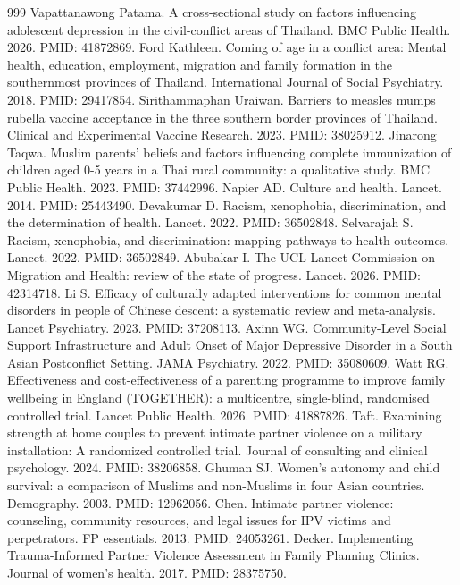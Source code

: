 \documentclass[11pt]{article}
\begin{document}
\begin{thebibliography}{999}
 Vapattanawong Patama. A cross-sectional study on factors influencing adolescent depression in the civil-conflict areas of Thailand. BMC Public Health. 2026. PMID: 41872869.
 Ford Kathleen. Coming of age in a conflict area: Mental health, education, employment, migration and family formation in the southernmost provinces of Thailand. International Journal of Social Psychiatry. 2018. PMID: 29417854.
 Sirithammaphan Uraiwan. Barriers to measles mumps rubella vaccine acceptance in the three southern border provinces of Thailand. Clinical and Experimental Vaccine Research. 2023. PMID: 38025912.
 Jinarong Taqwa. Muslim parents' beliefs and factors influencing complete immunization of children aged 0-5 years in a Thai rural community: a qualitative study. BMC Public Health. 2023. PMID: 37442996.
 Napier AD. Culture and health. Lancet. 2014. PMID: 25443490.
 Devakumar D. Racism, xenophobia, discrimination, and the determination of health. Lancet. 2022. PMID: 36502848.
 Selvarajah S. Racism, xenophobia, and discrimination: mapping pathways to health outcomes. Lancet. 2022. PMID: 36502849.
 Abubakar I. The UCL-Lancet Commission on Migration and Health: review of the state of progress. Lancet. 2026. PMID: 42314718.
 Li S. Efficacy of culturally adapted interventions for common mental disorders in people of Chinese descent: a systematic review and meta-analysis. Lancet Psychiatry. 2023. PMID: 37208113.
 Axinn WG. Community-Level Social Support Infrastructure and Adult Onset of Major Depressive Disorder in a South Asian Postconflict Setting. JAMA Psychiatry. 2022. PMID: 35080609.
 Watt RG. Effectiveness and cost-effectiveness of a parenting programme to improve family wellbeing in England (TOGETHER): a multicentre, single-blind, randomised controlled trial. Lancet Public Health. 2026. PMID: 41887826.
 Taft. Examining strength at home couples to prevent intimate partner violence on a military installation: A randomized controlled trial. Journal of consulting and clinical psychology. 2024. PMID: 38206858.
 Ghuman SJ. Women's autonomy and child survival: a comparison of Muslims and non-Muslims in four Asian countries. Demography. 2003. PMID: 12962056.
 Chen. Intimate partner violence: counseling, community resources, and legal issues for IPV victims and perpetrators. FP essentials. 2013. PMID: 24053261.
 Decker. Implementing Trauma-Informed Partner Violence Assessment in Family Planning Clinics. Journal of women's health. 2017. PMID: 28375750.

\end{thebibliography}
\end{document}
